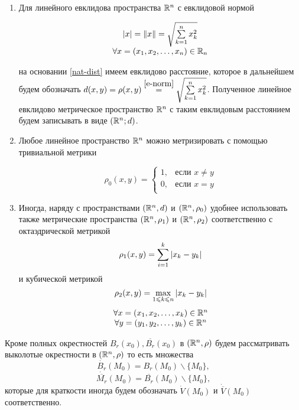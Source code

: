 \documentclass[../main.tex]{subfiles}
\begin{document}
\begin{rems} 

 \quad

 \begin{enumerate}
  \item  Для линейного евклидова пространства $\mathbb{R}^n$ с евклидовой
  нормой
  
  \begin{equation}
   \label{e-norm}
   \begin{array}{c}
    \left|{x}\right| = \lVert{x}\rVert = \sqrt{\sum\limits_{k=1}^n x_k^2} \\
    \forall x = (x_1, x_2, \dots, x_n) \in \mathbb{R}_n
   \end{array}
  \end{equation}
  
  на основании \eqref{nat-dist} имеем евклидово расстояние, которое
  в дальнейшем будем обозначать $d(x, y) = \rho(x, y) \stk{e-norm}{=}
  \sqrt{\sum\limits_{k=1}^n x_k^2}$. Полученное линейное евклидово 
  метрическое пространство $\mathbb{R}^n$ с таким евклидовым расстоянием 
  будем записывать в виде $(\mathbb{R}^n; d)$.
  
  \item Любое линейное пространство $\mathbb{R}^n$ можно метризировать с
  помощью тривиальной метрики
  
  \[
   \rho_0(x, y) =
   \begin{cases}
    1, & \text{если } x \ne y \\
    0, & \text{если } x = y \\
   \end{cases}
  \]
  
  \item Иногда, наряду с пространствами $(\mathbb{R}^n, d)$ и $(\mathbb{R}^n, \rho_0)$
  удобнее использовать также метрические пространства $(\mathbb{R}^n, \rho_1)$
  и $(\mathbb{R}^n, \rho_2)$ соответственно с октаэдрической метрикой
  \[\rho_1(x, y) = \sum_{i=1}^k \left|{x_k - y_k}\right|\]
  и кубической метрикой
  \[\rho_2(x, y) = \max_{1 \leqslant k \leqslant n} \left|{x_k - y_k}\right|\]
  \[\begin{array}{c}
     \forall x = (x_1, x_2, \dots, x_k) \in \mathbb{R}^n \\
     \forall y = (y_1, y_2, \dots, y_k) \in \mathbb{R}^n \\
    \end{array}\]
 \end{enumerate}

\end{rems}
\begin{rem}
    Кроме полных окрестностей $B_r(x_0), \overline{B_r}(x_0)$ в $
    (\mathbb{R}^n, \rho)$ будем рассматривать выколотые окрестности в $
    (\mathbb{R}^n, \rho)$ то есть множества
    \[
      \dot{B_r}(M_0) = B_r(M_0) \backslash \{M_0\},
    \]
    \[
      \dot{\overline{M_r}}(M_0) = \overline{B_r}(M_0) \backslash \{M_0\},
    \]
    которые для краткости иногда будем обозначать $\dot{V}(M_0) $ и 
    $\dot{\overline{V}}(M_0)$ соответственно. 
  \end{rem}
\end{document}
